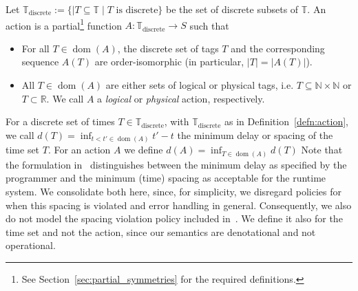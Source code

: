 \begin{defn}
    \label{defn:action}
Let $\mathbb{T}_\text{discrete} := \{ \mid T \subseteq \mathbb{T} \mid T \text{ is discrete}  \}$ be the set of discrete subsets of $\mathbb{T}$.
An action is a partial\footnote{See Section~\ref{sec:partial_symmetries} for the required definitions.} function $A : \mathbb{T}_\text{discrete} \rightarrow S$ such that
\begin{itemize}
    \item For all $T \in \operatorname{dom}(A)$, the discrete set of tags $T$ and the corresponding sequence $A(T)$ are order-isomorphic (in particular, $|T| = |A(T)|$).
    \item All $T \in \operatorname{dom}(A)$ are either sets of logical or physical tags, i.e. $T \subseteq \mathbb{N} \times \mathbb{N}$ or $T  \subset \mathbb{R}$. We call $A$ a \emph{logical} or \emph{physical} action, respectively.
\end{itemize}
\end{defn}

For a discrete set of times $T \in \mathbb{T}_\text{discrete}$, with $\mathbb{T}_\text{discrete}$ as in Definition~\ref{defn:action}, we call $d(T) = \operatorname{inf}_{t < t' \in \operatorname{dom}(A)} t' - t$ the minimum delay or spacing of the time set $T$. 
For an action $A$ we define $d(A) = \operatorname{inf}_{T \in \operatorname{dom}(A)} d(T)$
Note that the formulation in~\cite{lohstroh_phdthesis} distinguishes between the minimum delay as specified by the programmer and the minimum (time) spacing as acceptable for the runtime system.
We consolidate both here, since, for simplicity, we disregard policies for when this spacing is violated and error handling in general.
Consequently, we also do not model the spacing violation policy included in~\cite{lohstroh_phdthesis}. 
We define it also for the time set and not the action, since our semantics are denotational and not operational.


